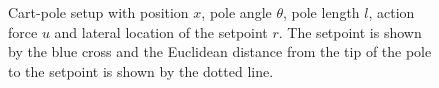 \begin{figure}
\centering

\caption{Cart-pole setup with position $x$,  pole angle $\theta$, pole length $l$, action force $u$ and lateral location of the setpoint $r$. The setpoint is shown by the blue cross and the Euclidean distance from the tip of the pole to the setpoint is shown by the dotted line. }
\label{fig:cartpole}
\end{figure}









